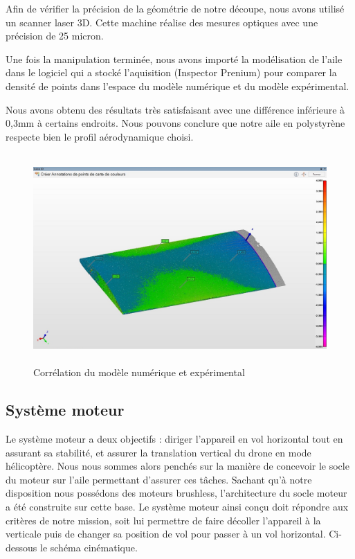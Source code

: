 \documentclass[a4paper,12pt,french]{report}
\begin{document}
Afin de vérifier la précision de la géométrie de notre découpe, nous avons utilisé un scanner laser 3D. Cette machine réalise des mesures optiques avec une précision de 25 micron.\newline

Une fois la manipulation terminée, nous avons importé la modélisation de l'aile dans le logiciel qui a stocké l'aquisition (Inspector Prenium) pour comparer la densité de points dans l'espace du modèle numérique et du modèle expérimental.\newline

Nous avons obtenu des résultats très satisfaisant avec une différence inférieure à 0,3mm à certains endroits. Nous pouvons conclure que notre aile en polystyrène respecte bien le profil aérodynamique choisi.

\begin{figure}[h]
    \centering
    \includegraphics[height=8cm]{figures/geo.jpg}
    \caption{Corrélation du modèle numérique et expérimental}
    \label{ailepoly}
\end{figure}

\newpage
\subsection{Système moteur}

Le système moteur a deux objectifs : diriger l'appareil en vol horizontal tout en assurant sa stabilité, et assurer la translation vertical du drone en mode hélicoptère. Nous nous sommes alors penchés sur la manière de concevoir le socle du moteur sur l’aile permettant d'assurer ces tâches. Sachant qu’à notre disposition nous possédons des moteurs brushless, l’architecture du socle moteur a été construite sur cette base. Le système moteur ainsi conçu doit répondre aux critères de notre mission, soit lui permettre de faire décoller l’appareil à la verticale puis de changer sa position de vol pour passer à un vol horizontal. Ci-dessous le schéma cinématique.\newline
\end{document}
